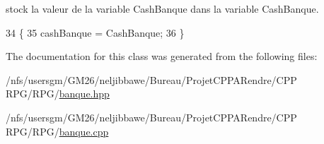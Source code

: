 stock la valeur de la variable Cash\-Banque dans la variable Cash\-Banque. 


\begin{DoxyCode}
34                                                 \{
35             cashBanque = CashBanque;
36   \}
\end{DoxyCode}


The documentation for this class was generated from the following files\-:\begin{DoxyCompactItemize}
\item 
/nfs/usersgm/\-G\-M26/neljibbawe/\-Bureau/\-Projet\-C\-P\-P\-A\-Rendre/\-C\-P\-P R\-P\-G/\-R\-P\-G/\hyperlink{banque_8hpp}{banque.\-hpp}\item 
/nfs/usersgm/\-G\-M26/neljibbawe/\-Bureau/\-Projet\-C\-P\-P\-A\-Rendre/\-C\-P\-P R\-P\-G/\-R\-P\-G/\hyperlink{banque_8cpp}{banque.\-cpp}\end{DoxyCompactItemize}
